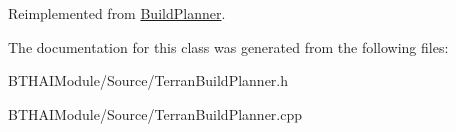 Reimplemented from \hyperlink{class_build_planner_a06b0db27196c7e1ecc0181f2d3865a88}{BuildPlanner}.



The documentation for this class was generated from the following files:\begin{DoxyCompactItemize}
\item 
BTHAIModule/Source/TerranBuildPlanner.h\item 
BTHAIModule/Source/TerranBuildPlanner.cpp\end{DoxyCompactItemize}
